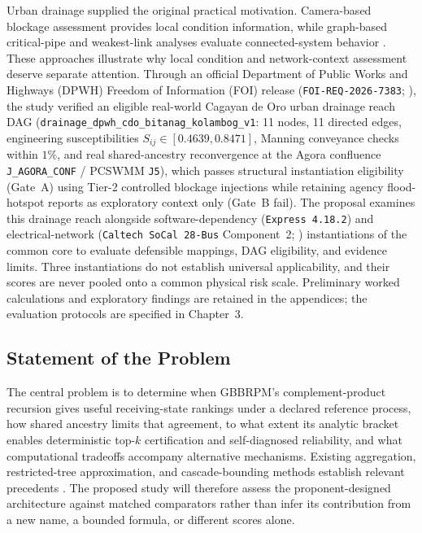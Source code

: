 Urban drainage supplied the original practical motivation. Camera-based
blockage assessment provides local condition information, while graph-based
critical-pipe and weakest-link analyses evaluate connected-system behavior
\citep{vandaele2024,dastgir2023,meijer2023}. These approaches illustrate why
local condition and network-context assessment deserve separate attention.
Through an official Department of Public Works and Highways (DPWH) Freedom of
Information (FOI) release (\texttt{FOI-REQ-2026-7383};
\citealp{dpwh2026foi,upplanades2016}), the study verified an eligible
real-world Cagayan de Oro urban drainage reach DAG
(\texttt{drainage\_\allowbreak dpwh\_\allowbreak cdo\_\allowbreak bitanag\_\allowbreak kolambog\_\allowbreak v1}: 11 nodes, 11 directed
edges, engineering susceptibilities $S_{ij} \in [0.4639, 0.8471]$, Manning
conveyance checks within $1\%$, and real shared-ancestry reconvergence at the
Agora confluence \texttt{J\_AGORA\_CONF} / PCSWMM \texttt{J5}), which passes
structural instantiation eligibility (Gate~A) using Tier-2 controlled
blockage injections while retaining agency flood-hotspot reports as
exploratory context only (Gate~B fail). The proposal examines this drainage
reach alongside software-dependency (\texttt{Express 4.18.2}) and
electrical-network (\texttt{Caltech SoCal 28-Bus} Component~2;
\citealp{xie2025}) instantiations of the common core to evaluate defensible
mappings, DAG eligibility, and evidence limits. Three instantiations do not
establish universal applicability, and their scores are never pooled onto a
common physical risk scale. Preliminary worked calculations and exploratory
findings are retained in the appendices; the evaluation protocols are
specified in Chapter~3.

\subsection{Statement of the Problem}\label{statement-of-the-problem}

The central problem is to determine when GBBRPM's complement-product
recursion gives useful receiving-state rankings under a declared reference
process, how shared ancestry limits that agreement, to what extent its
analytic bracket enables deterministic top-$k$ certification and self-diagnosed
reliability, and what computational tradeoffs accompany alternative mechanisms.
Existing aggregation, restricted-tree approximation, and cascade-bounding
methods establish relevant precedents
\citep{klement2004,chen2010mia,abbe2017,abbe2020}. The proposed study will
therefore assess the proponent-designed architecture against matched
comparators rather than infer its contribution from a new name, a bounded
formula, or different scores alone.

